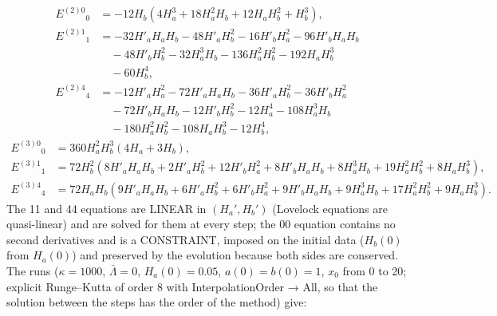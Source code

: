 \documentclass[10pt,a4paper]{article}
\begin{document}
\begin{align*}
E^{(2)0}{}_0&=- 12 H_{b} \left(4 H_{a}^{3} + 18 H_{a}^{2} H_{b} + 12 H_{a} H_{b}^{2} + H_{b}^{3}\right), \\
E^{(2)1}{}_1&=- 32 H'_{a} H_{a} H_{b} - 48 H'_{a} H_{b}^{2} - 16 H'_{b} H_{a}^{2} - 96 H'_{b} H_{a} H_{b} \\
&\quad - 48 H'_{b} H_{b}^{2} - 32 H_{a}^{3} H_{b} - 136 H_{a}^{2} H_{b}^{2} - 192 H_{a} H_{b}^{3} \\
&\quad - 60 H_{b}^{4}, \\
E^{(2)4}{}_4&=- 12 H'_{a} H_{a}^{2} - 72 H'_{a} H_{a} H_{b} - 36 H'_{a} H_{b}^{2} - 36 H'_{b} H_{a}^{2} \\
&\quad - 72 H'_{b} H_{a} H_{b} - 12 H'_{b} H_{b}^{2} - 12 H_{a}^{4} - 108 H_{a}^{3} H_{b} \\
&\quad - 180 H_{a}^{2} H_{b}^{2} - 108 H_{a} H_{b}^{3} - 12 H_{b}^{4},
\end{align*}
\begin{align*}
E^{(3)0}{}_0&=360 H_{a}^{2} H_{b}^{3} \left(4 H_{a} + 3 H_{b}\right), \\
E^{(3)1}{}_1&=72 H_{b}^{2} \left(8 H'_{a} H_{a} H_{b} + 2 H'_{a} H_{b}^{2} + 12 H'_{b} H_{a}^{2} + 8 H'_{b} H_{a} H_{b} + 8 H_{a}^{3} H_{b} + 19 H_{a}^{2} H_{b}^{2} + 8 H_{a} H_{b}^{3}\right), \\
E^{(3)4}{}_4&=72 H_{a} H_{b} \left(9 H'_{a} H_{a} H_{b} + 6 H'_{a} H_{b}^{2} + 6 H'_{b} H_{a}^{2} + 9 H'_{b} H_{a} H_{b} + 9 H_{a}^{3} H_{b} + 17 H_{a}^{2} H_{b}^{2} + 9 H_{a} H_{b}^{3}\right).
\end{align*}
The 11 and 44 equations are LINEAR in $(H_a',H_b')$ (Lovelock equations are quasi-linear) and are solved for them at every step; the 00 equation contains no second derivatives and is a CONSTRAINT, imposed on the initial data ($H_b(0)$ from $H_a(0)$) and preserved by the evolution because both sides are conserved. The runs ($\kappa=1000$, $\bar\Lambda=0$, $H_a(0)=0.05$, $a(0)=b(0)=1$, $x_0$ from 0 to 20; explicit Runge–Kutta of order 8 with InterpolationOrder → All, so that the solution between the steps has the order of the method) give:
\end{document}
